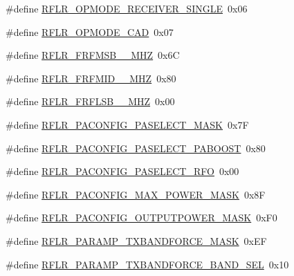 \begin{DoxyCompactItemize}
\item 
\#define \mbox{\hyperlink{sx1276_regs-_lo_ra_8h_a0cfa7959ea68f8e81d1ee04e8a3ef596}{R\+F\+L\+R\+\_\+\+O\+P\+M\+O\+D\+E\+\_\+\+R\+E\+C\+E\+I\+V\+E\+R\+\_\+\+S\+I\+N\+G\+LE}}~0x06
\item 
\#define \mbox{\hyperlink{sx1276_regs-_lo_ra_8h_a8e3c7ec4d0aceedae1069a3b6d8d6bd2}{R\+F\+L\+R\+\_\+\+O\+P\+M\+O\+D\+E\+\_\+\+C\+AD}}~0x07
\item 
\#define \mbox{\hyperlink{sx1276_regs-_lo_ra_8h_ac8e626a7d3028cc58dbe937ce2cb4fef}{R\+F\+L\+R\+\_\+\+F\+R\+F\+M\+S\+B\+\_\+\_\+\+M\+HZ}}~0x6C
\item 
\#define \mbox{\hyperlink{sx1276_regs-_lo_ra_8h_a2b6e1709a469a8e5fe8c3099036576b2}{R\+F\+L\+R\+\_\+\+F\+R\+F\+M\+I\+D\+\_\+\_\+\+M\+HZ}}~0x80
\item 
\#define \mbox{\hyperlink{sx1276_regs-_lo_ra_8h_a9fbeb4068d680304497804b2e3b01cc1}{R\+F\+L\+R\+\_\+\+F\+R\+F\+L\+S\+B\+\_\+\_\+\+M\+HZ}}~0x00
\item 
\#define \mbox{\hyperlink{sx1276_regs-_lo_ra_8h_a98fc674afce865acf9efb9a1c2ab39a3}{R\+F\+L\+R\+\_\+\+P\+A\+C\+O\+N\+F\+I\+G\+\_\+\+P\+A\+S\+E\+L\+E\+C\+T\+\_\+\+M\+A\+SK}}~0x7F
\item 
\#define \mbox{\hyperlink{sx1276_regs-_lo_ra_8h_a268b1d9d7fa806038150cabff6dee9a7}{R\+F\+L\+R\+\_\+\+P\+A\+C\+O\+N\+F\+I\+G\+\_\+\+P\+A\+S\+E\+L\+E\+C\+T\+\_\+\+P\+A\+B\+O\+O\+ST}}~0x80
\item 
\#define \mbox{\hyperlink{sx1276_regs-_lo_ra_8h_a584857e70a2e6fddfb11bc51775b35a6}{R\+F\+L\+R\+\_\+\+P\+A\+C\+O\+N\+F\+I\+G\+\_\+\+P\+A\+S\+E\+L\+E\+C\+T\+\_\+\+R\+FO}}~0x00
\item 
\#define \mbox{\hyperlink{sx1276_regs-_lo_ra_8h_a2045361d9d317c305aed6e405420ab81}{R\+F\+L\+R\+\_\+\+P\+A\+C\+O\+N\+F\+I\+G\+\_\+\+M\+A\+X\+\_\+\+P\+O\+W\+E\+R\+\_\+\+M\+A\+SK}}~0x8F
\item 
\#define \mbox{\hyperlink{sx1276_regs-_lo_ra_8h_a1d4448a184c398c43e06bfad5102730f}{R\+F\+L\+R\+\_\+\+P\+A\+C\+O\+N\+F\+I\+G\+\_\+\+O\+U\+T\+P\+U\+T\+P\+O\+W\+E\+R\+\_\+\+M\+A\+SK}}~0x\+F0
\item 
\#define \mbox{\hyperlink{sx1276_regs-_lo_ra_8h_a9112c35a5e33d45453157d1a04591294}{R\+F\+L\+R\+\_\+\+P\+A\+R\+A\+M\+P\+\_\+\+T\+X\+B\+A\+N\+D\+F\+O\+R\+C\+E\+\_\+\+M\+A\+SK}}~0x\+EF
\item 
\#define \mbox{\hyperlink{sx1276_regs-_lo_ra_8h_ad45572b9fe781c4e783cc7aef19b1406}{R\+F\+L\+R\+\_\+\+P\+A\+R\+A\+M\+P\+\_\+\+T\+X\+B\+A\+N\+D\+F\+O\+R\+C\+E\+\_\+\+B\+A\+N\+D\+\_\+\+S\+EL}}~0x10

\end{DoxyCompactItemize}
